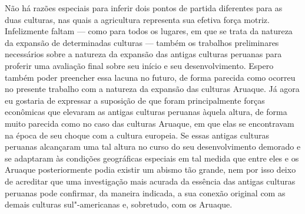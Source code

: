 Não há razões especiais para inferir dois pontos de partida diferentes
para as duas culturas, nas quais a agricultura representa sua efetiva
força motriz. Infelizmente faltam --- como para todos os lugares, em que
se trata da natureza da expansão de determinadas culturas --- também os
trabalhos preliminares necessários sobre a natureza da expansão das
antigas culturas peruanas para proferir uma avaliação final sobre seu
início e seu desenvolvimento. Espero também poder preencher essa lacuna
no futuro, de forma parecida como ocorreu no presente trabalho com a
natureza da expansão das culturas Aruaque. Já agora eu gostaria de
expressar a suposição de que foram principalmente forças econômicas que
elevaram as antigas culturas peruanas àquela altura, de forma muito
parecida como no caso das culturas Aruaque, em que elas se encontravam
na época de seu choque com a cultura europeia. Se essas antigas culturas
peruanas alcançaram uma tal altura no curso do seu desenvolvimento
demorado e se adaptaram às condições geográficas especiais em tal medida
que entre eles e os Aruaque posteriormente podia existir um abismo tão
grande, nem por isso deixo de acreditar que uma investigação mais
acurada da essência das antigas culturas peruanas pode confirmar, da
maneira indicada, a sua conexão original com as demais culturas
sul"-americanas e, sobretudo, com os Aruaque.

